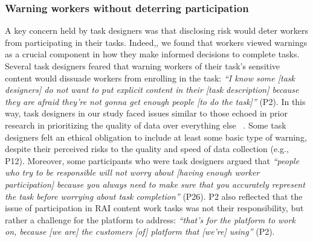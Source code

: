 \subsubsection{Warning workers without deterring participation}
A key concern held by task designers was that disclosing risk would deter workers from participating in their tasks. Indeed,, we found that workers viewed warnings as a crucial component in how they make informed decisions to complete tasks. 
Several task designers feared that warning workers of their task's sensitive content would dissuade workers from enrolling in the task: \textit{``I know some [task designers] do not want to put explicit content in their [task description] because they are afraid they're not gonna get enough people [to do the task]''} (P2). In this way, task designers in our study faced issues similar to those echoed in prior research in prioritizing the quality of data over everything else ~\cite{qian2025locating, finnerty2013keep, kittur2008crowdsourcing}. Some task designers felt an ethical obligation to include at least some basic type of warning, despite their perceived risks to the quality and speed of data collection (e.g., P12). Moreover, some participants who were task designers argued that \textit{``people who try to be responsible will not worry about [having enough worker participation] because you always need to make sure that you accurately represent the task before worrying about task completion''} (P26). P2 also reflected that the issue of participation in RAI content work tasks was not their responsibility, but rather a challenge for the platform to address: \textit{``that's for the platform to work on, because [we are] the customers [of] platform that [we're] using''} (P2). 

